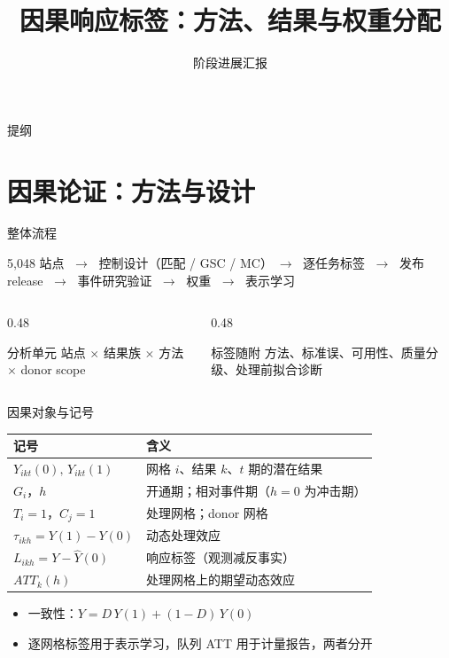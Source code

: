 \documentclass[aspectratio=169,11pt]{beamer}
\title{因果响应标签：方法、结果与权重分配}
\subtitle{阶段进展汇报}
\author{}
\institute{}
\date{}
\begin{document}
\begin{frame}[plain]
  \titlepage
\end{frame}

\begin{frame}{提纲}
  \tableofcontents
\end{frame}

\section{因果论证：方法与设计}

\begin{frame}{整体流程}
  \begin{center}
    5{,}048 站点 $\;\to\;$ 控制设计（匹配 / GSC / MC）$\;\to\;$ 逐任务标签
    $\;\to\;$ 发布 release $\;\to\;$ 事件研究验证 $\;\to\;$ 权重 $\;\to\;$ 表示学习
  \end{center}
  \medskip
  \begin{columns}[T]
    \begin{column}{0.48\textwidth}
      \begin{block}{分析单元}
        \small 站点 $\times$ 结果族 $\times$ 方法 $\times$ donor scope
      \end{block}
    \end{column}
    \begin{column}{0.48\textwidth}
      \begin{block}{标签随附}
        \small 方法、标准误、可用性、质量分级、处理前拟合诊断
      \end{block}
    \end{column}
  \end{columns}
\end{frame}

\begin{frame}{因果对象与记号}
  \small
  \begin{tabular}{ll}
    \toprule
    记号 & 含义 \\
    \midrule
    $Y_{ikt}(0),\,Y_{ikt}(1)$ & 网格 $i$、结果 $k$、$t$ 期的潜在结果 \\
    $G_i$，$h$ & 开通期；相对事件期（$h=0$ 为冲击期） \\
    $T_i=1$，$C_j=1$ & 处理网格；donor 网格 \\
    $\tau_{ikh}=Y(1)-Y(0)$ & 动态处理效应 \\
    $L_{ikh}=Y-\hat Y(0)$ & 响应标签（观测减反事实） \\
    $ATT_k(h)$ & 处理网格上的期望动态效应 \\
    \bottomrule
  \end{tabular}
  \medskip
  \begin{itemize}
    \item 一致性：$Y=D\,Y(1)+(1-D)\,Y(0)$
    \item 逐网格标签用于表示学习，队列 ATT 用于计量报告，两者分开
  \end{itemize}
\end{frame}
\end{document}
